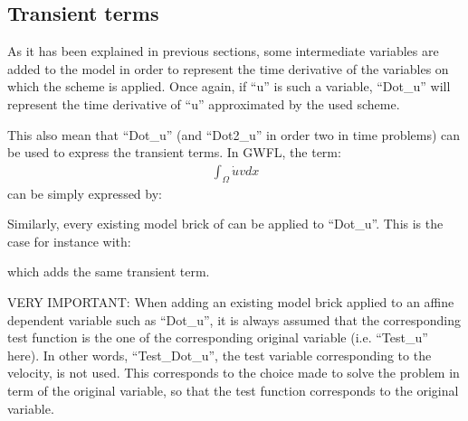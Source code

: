 \documentclass[a4paper,11pt,english]{sphinxmanual}
\begin{document}
\begin{sphinxVerbatim}[commandchars=\\\{\}]
    
\end{sphinxVerbatim}


\subsection{Transient terms}
\label{\detokenize{userdoc/model_time_integration:transient-terms}}
As it has been explained in previous sections, some intermediate variables are added to the model in order to represent the time derivative of the variables on which the scheme is applied. Once again, if “u” is such a variable, “Dot\_u” will represent the time derivative of “u” approximated by the used scheme.

This also mean that “Dot\_u” (and “Dot2\_u” in order two in time problems) can be used to express the transient terms. In GWFL, the term:
\begin{equation*}
\begin{split}\int_{\Omega} \dot{u} v dx\end{split}
\end{equation*}
can be simply expressed by:

\begin{sphinxVerbatim}[commandchars=\\\{\}]
\end{sphinxVerbatim}

Similarly, every existing model brick of  can be applied to “Dot\_u”. This is the case for instance with:

\begin{sphinxVerbatim}[commandchars=\\\{\}]
  
\end{sphinxVerbatim}

which adds the same transient term.

VERY IMPORTANT: When adding an existing model brick applied to an affine dependent variable such as “Dot\_u”, it is always assumed that the corresponding test function is the one of the corresponding original variable (i.e. “Test\_u” here). In other words, “Test\_Dot\_u”, the test variable corresponding to the velocity, is not used. This corresponds to the choice made to solve the problem in term of the original variable, so that the test function corresponds to the original variable.
\end{document}
